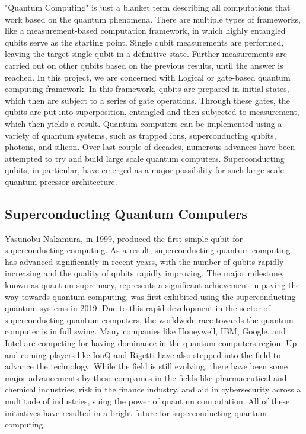 \documentclass{article}
\begin{document}
\vspace{5mm}

\noindent
"Quantum Computing" is just a blanket term describing all computations that work based on the quantum phenomena. There are multiple types of frameworks, like a measurement-based computation framework, in which highly entangled qubits serve as the starting point. Single qubit measurements are performed, leaving the target single qubit in a definitive state. Further measurements are carried out on other qubits based on the previous results, until the answer is reached. In this project, we are concerned with Logical or gate-based quantum computing framework. In this framework, qubits are prepared in initial states, which then are subject to a series of gate operations. Through these gates, the qubits are put into superposition, entangled and then subjected to measurement, which then yields a result. 
Quantum computers can be implemented using a variety of quantum systems, such as trapped ions, superconducting qubits, photons, and silicon. Over last couple of decades, numerous advances have been attempted to try and build large scale quantum computers. Superconducting qubits, in particular, have emerged as a major possibility for such large scale quantum prcessor architecture.

\noindent
\subsection{Superconducting Quantum Computers}
\noindent
Yasunobu Nakamura, in 1999, produced the first simple qubit for superconducting computing. As a result, superconducting quantum computing has advanced significantly in recent years, with the number of qubits rapidly increasing and the quality of qubits rapidly improving. The major milestone, known as quantum supremacy, represents a significant achievement in paving the way towards quantum computing, was first exhibited using the superconducting quantum systems in 2019. Due to this rapid development in the sector of superconducting quantum computers, the worldwide race towards the quantum computer is in full swing.%
Many companies like Honeywell, IBM, Google, and Intel are competing for having dominance in the quantum computers region. Up and coming players like IonQ and Rigetti have also stepped into the field to advance the technology. While the field is still evolving, there have been some major advancements by these companies in the fields like pharmaceutical and chemical industries, risk in the finance industry, and aid in cybersecurity across a multitude of industries, suing the power of quantum computation.   %
All of these initiatives have resulted in a bright future for superconducting quantum computing. %
\end{document}
